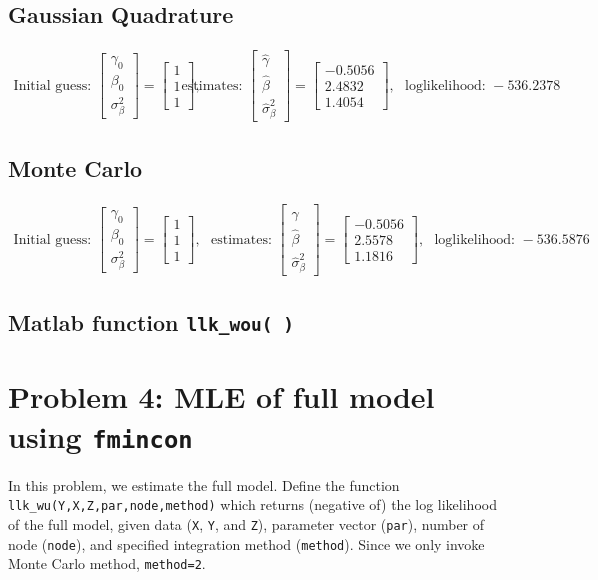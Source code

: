 \documentclass[11pt,letter]{article}
\newcounter{lem}[section] \setcounter{lem}{0}
\newcommand{\bmat}[1]{\begin{bmatrix} #1 \end{bmatrix}}%
\newcommand{\code}[1]{\texttt{#1}}
\begin{document}
\subsection*{Gaussian Quadrature}
\begin{align*}
\text{Initial guess: }\bmat{\gamma_0 \\ \beta_0 \\ \sigma_\beta^2} = \bmat{1 \\ 1 \\ 1}, \ \ \ 
&\text{estimates: }\bmat{\hat{\gamma} \\ \hat{\beta} \\ \hat{\sigma}_\beta^2} = \bmat{-0.5056 \\ 2.4832 \\ 1.4054}, \ \ \ 
\text{loglikelihood: }-536.2378 
\end{align*}

\subsection*{Monte Carlo}
\begin{align*}
\text{Initial guess: }\bmat{\gamma_0 \\ \beta_0 \\ \sigma_\beta^2} = \bmat{1 \\ 1 \\ 1}, \ \ \ 
\text{estimates: }\bmat{\hat{\gamma} \\ \hat{\beta} \\ \hat{\sigma}_\beta^2} = \bmat{-0.5056 \\ 2.5578 \\ 1.1816}, \ \ \ 
\text{loglikelihood: }-536.5876
\end{align*}


\subsection*{Matlab function \code{llk\_wou( )}}



\section*{Problem 4: MLE of full model using \code{fmincon}}

In this problem, we estimate the full model. Define the function \code{llk\_wu(Y,X,Z,par,node,method)} which returns (negative of) the log likelihood of the full model, given data (\code{X}, \code{Y}, and \code{Z}), parameter vector (\code{par}), number of node (\code{node}), and specified integration method (\code{method}). Since we only invoke Monte Carlo method, \code{method=2}.  
\end{document}
